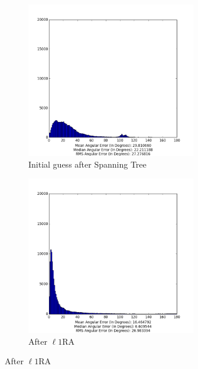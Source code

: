 \documentclass[conference, 12pt]{acmsiggraph}
\begin{document}
\begin{figure}[H]
  \centering
  \begin{subfigure}{0.5\textwidth}
    \centering
    \includegraphics[width=0.81\textwidth]{images/final_span.png}
    \caption{Initial guess after Spanning Tree}
    \label{fig:post_span}
  \end{subfigure}

    \begin{subfigure}{0.5\textwidth}
    \centering
    \includegraphics[width=0.81\textwidth]{images/final_post_l1.png}
    \caption{After $\ell1$RA}
    \label{fig:post_l1ra}
  \end{subfigure}


\end{figure}
\end{document}
